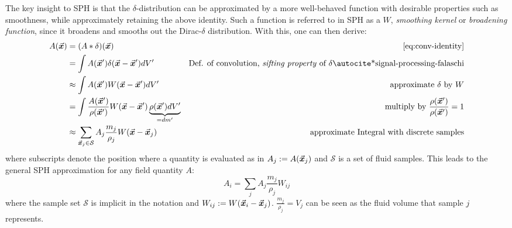The key insight to SPH is that the $\delta$-distribution can be approximated by a more well-behaved function with desirable properties such as smoothness, while approximately retaining the above identity. Such a function is referred to in SPH as a  $W$, \textit{smoothing kernel}\autocite*{tutorial} or \textit{broadening function}\autocite*{sph-lucy-77}, since it broadens and smooths out the Dirac-$\delta$ distribution. With this, one can then derive\autocite*{tutorial}:
\begin{align}
  A(\vek{x}) & = (A * \delta)(\vek{x})                                                                             & \text{\autoref{eq:conv-identity}}                                                                       \\
             & = \int A(\vek{x}') \delta(\vek{x}-\vek{x}') dV'                                                     & \text{Def. of convolution, \textit{sifting property} of $\delta$\autocite*{signal-processing-falaschi}} \\                                                             \label{eq:sph-derivation-kernel-approx}
             & \approx \int A(\vek{x}') W(\vek{x}-\vek{x}') dV'                                                    & \text{approximate $\delta$ by $W$}                                                                      \\
             & = \int \frac{A(\vek{x}')}{\rho(\vek{x}')} W(\vek{x}-\vek{x}') \underbrace{\rho(\vek{x}')dV'}_{=dm'} & \text{multiply by $\frac{\rho(\vek{x}')}{\rho(\vek{x}')}=1$}                                            \\\label{eq:sph-derivation-sum-approx}
             & \approx \sum_{\vek{x}_j\in\mathcal{S}} A_j \frac{m_j}{\rho_j} W(\vek{x}-\vek{x}_j)                  & \text{approximate Integral with discrete samples}
\end{align}
where subscripts denote the position where a quantity is evaluated as in $A_j := A(\vec{\bm{x}}_j)$ and $\mathcal{S}$ is a set of fluid samples. This leads to the general SPH approximation for any field quantity $A$\autocite*{tutorial}:
\begin{equation}\label{eq:sph-any-quantity}
  A_i = \sum_j A_j \frac{m_j}{\rho_j} W_{ij}
\end{equation}
where the sample set $\mathcal{S}$ is implicit in the notation and $W_{ij} := W(\vec{\bm{x}}_i-\vec{\bm{x}}_j)$. $\frac{m_j}{\rho_j} = V_j$ can be seen as the fluid volume that sample $j$ represents.

